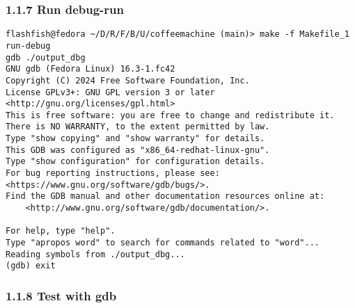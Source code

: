 \documentclass{report}
\begin{document}
\subsubsection*{1.1.7 Run debug-run}

\begin{lstlisting}[style=cppstyle, title=\texttt{Terminal Output}]
flashfish@fedora ~/D/R/F/B/U/coffeemachine (main)> make -f Makefile_1 run-debug
gdb ./output_dbg
GNU gdb (Fedora Linux) 16.3-1.fc42
Copyright (C) 2024 Free Software Foundation, Inc.
License GPLv3+: GNU GPL version 3 or later <http://gnu.org/licenses/gpl.html>
This is free software: you are free to change and redistribute it.
There is NO WARRANTY, to the extent permitted by law.
Type "show copying" and "show warranty" for details.
This GDB was configured as "x86_64-redhat-linux-gnu".
Type "show configuration" for configuration details.
For bug reporting instructions, please see:
<https://www.gnu.org/software/gdb/bugs/>.
Find the GDB manual and other documentation resources online at:
    <http://www.gnu.org/software/gdb/documentation/>.

For help, type "help".
Type "apropos word" to search for commands related to "word"...
Reading symbols from ./output_dbg...
(gdb) exit
\end{lstlisting}

\subsubsection*{1.1.8 Test with gdb}
\end{document}
